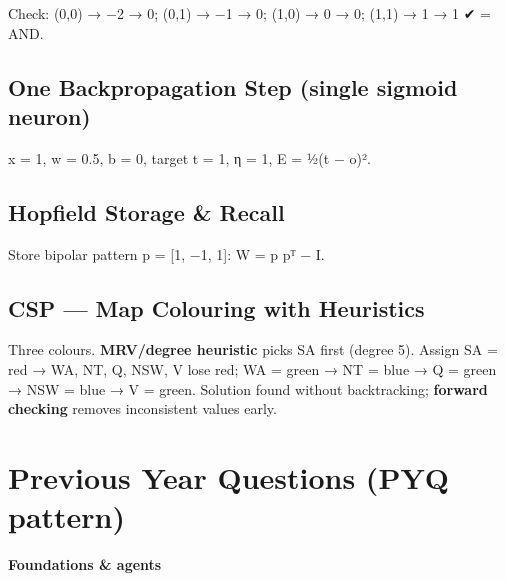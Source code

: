 \endgroup

Check: (0,0) → −2 → 0; (0,1) → −1 → 0; (1,0) → 0 → 0; (1,1) → 1 → 1 ✔ = AND.

\needspace{125pt}

\hypertarget{p2-10--118-one-backpropagation-step-single-sigmoid-neuron}{%
\subsection{One Backpropagation Step (single sigmoid neuron)}\label{p2-10--118-one-backpropagation-step-single-sigmoid-neuron}}

x = 1, w = 0.5, b = 0, target t = 1, η = 1, E = ½(t − o)².



\needspace{125pt}

\hypertarget{p2-10--119-hopfield-storage--recall}{%
\subsection{Hopfield Storage \& Recall}\label{p2-10--119-hopfield-storage--recall}}

Store bipolar pattern p = {[}1, −1, 1{]}: W = p pᵀ − I.



\needspace{95pt}

\hypertarget{p2-10--1110-csp--map-colouring-with-heuristics}{%
\subsection{CSP --- Map Colouring with Heuristics}\label{p2-10--1110-csp--map-colouring-with-heuristics}}



Three colours. \textbf{MRV/degree heuristic} picks SA first (degree 5). Assign SA = red → WA, NT, Q, NSW, V lose red; WA = green → NT = blue → Q = green → NSW = blue → V = green. Solution found without backtracking; \textbf{forward checking} removes inconsistent values early.

\needspace{125pt}

\hypertarget{p2-10--previous-year-questions-pyq-pattern}{%
\section{Previous Year Questions (PYQ pattern)}\label{p2-10--previous-year-questions-pyq-pattern}}

\textbf{Foundations \& agents}

